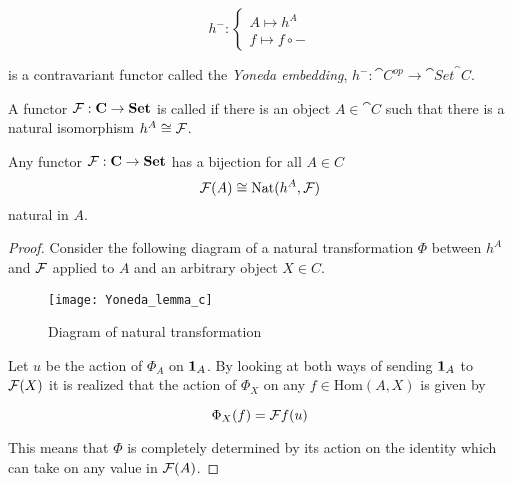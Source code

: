 \documentclass[../../main.tex]{subfiles}
\begin{document}
    \begin{equation*}
        h^-: 
        \begin{cases}
            A \mapsto h^A \\
            f \mapsto f \circ -
        \end{cases}
    \end{equation*}
    
    is a contravariant functor called the \emph{Yoneda embedding}, $h^-: \cat{C}^{op} \to \cat{Set}^\cat{C}$.
    
    \begin{definition}
        A functor $\functor{F}: \cat{C} \to \cat{Set}$ is called  if there is an object $A \in \cat{C}$ such that there is a natural isomorphism $h^A \cong \functor{F}$.
    \end{definition}
    
    \begin{theorem}
        Any functor $\functor{F}: \cat{C} \to \cat{Set}$ has a bijection for all $A \in C$ 
        $$\functor{F}(A) \cong \mathrm{Nat}(h^A, \functor{F})$$ 
        natural in $A$.
    \end{theorem}
    
    \begin{proof}
        Consider the following diagram of a natural transformation $\Phi$ between $h^A$ and $\functor{F}$ applied to $A$ and an arbitrary object $X \in C$. 
        
        \begin{figure}[H]
            \centering
            \texttt{[image: Yoneda\_lemma\_c]}
            \caption{Diagram of natural transformation}
            \label{fig:boat1}
        \end{figure}

        Let $u$ be the action of $\Phi_A$ on $\idarrow[A]$. By looking at both ways of sending $\idarrow[A]$ to $\functor{F}(X)$ it is realized that the action of $\Phi_X$ on any $f \in \mathrm{Hom}(A, X)$ is given by 

        \begin{equation}
            \Phi_X(f) = \functor{F}f(u)
        \end{equation}
        
        This means that $\Phi$ is completely determined by its action on the identity which can take on any value in $\functor{F}(A)$.
    \end{proof}
\end{document}
